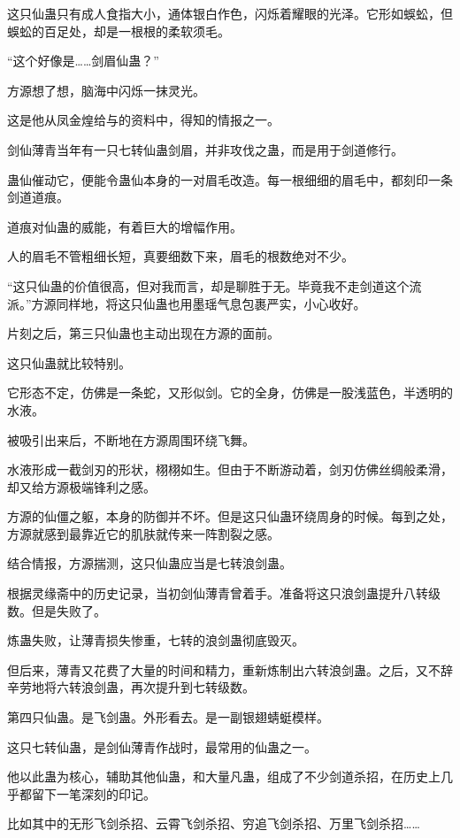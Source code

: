 
\begin{this_body}

这只仙蛊只有成人食指大小，通体银白作色，闪烁着耀眼的光泽。它形如蜈蚣，但蜈蚣的百足处，却是一根根的柔软须毛。

“这个好像是……剑眉仙蛊？”

方源想了想，脑海中闪烁一抹灵光。

这是他从凤金煌给与的资料中，得知的情报之一。

剑仙薄青当年有一只七转仙蛊剑眉，并非攻伐之蛊，而是用于剑道修行。

蛊仙催动它，便能令蛊仙本身的一对眉毛改造。每一根细细的眉毛中，都刻印一条剑道道痕。

道痕对仙蛊的威能，有着巨大的增幅作用。

人的眉毛不管粗细长短，真要细数下来，眉毛的根数绝对不少。

“这只仙蛊的价值很高，但对我而言，却是聊胜于无。毕竟我不走剑道这个流派。”方源同样地，将这只仙蛊也用墨瑶气息包裹严实，小心收好。

片刻之后，第三只仙蛊也主动出现在方源的面前。

这只仙蛊就比较特别。

它形态不定，仿佛是一条蛇，又形似剑。它的全身，仿佛是一股浅蓝色，半透明的水液。

被吸引出来后，不断地在方源周围环绕飞舞。

水液形成一截剑刃的形状，栩栩如生。但由于不断游动着，剑刃仿佛丝绸般柔滑，却又给方源极端锋利之感。

方源的仙僵之躯，本身的防御并不坏。但是这只仙蛊环绕周身的时候。每到之处，方源就感到最靠近它的肌肤就传来一阵割裂之感。

结合情报，方源揣测，这只仙蛊应当是七转浪剑蛊。

根据灵缘斋中的历史记录，当初剑仙薄青曾着手。准备将这只浪剑蛊提升八转级数。但是失败了。

炼蛊失败，让薄青损失惨重，七转的浪剑蛊彻底毁灭。

但后来，薄青又花费了大量的时间和精力，重新炼制出六转浪剑蛊。之后，又不辞辛劳地将六转浪剑蛊，再次提升到七转级数。

第四只仙蛊。是飞剑蛊。外形看去。是一副银翅蜻蜓模样。

这只七转仙蛊，是剑仙薄青作战时，最常用的仙蛊之一。

他以此蛊为核心，辅助其他仙蛊，和大量凡蛊，组成了不少剑道杀招，在历史上几乎都留下一笔深刻的印记。

比如其中的无形飞剑杀招、云霄飞剑杀招、穷追飞剑杀招、万里飞剑杀招……


\end{this_body}
